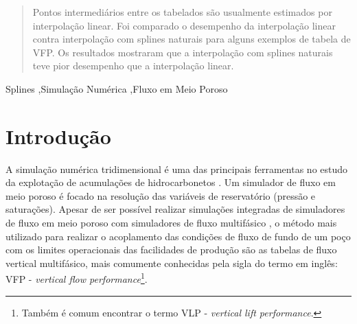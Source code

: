 \documentclass[final,5p]{elsarticle}
\numberwithin{equation}{section}
\begin{document}
\begin{frontmatter}
\begin{abstract}
    Pontos intermediários entre os tabelados são usualmente estimados por interpolação linear. Foi comparado o desempenho da interpolação linear contra interpolação com splines naturais para alguns exemplos de tabela de VFP. Os resultados mostraram que a interpolação com splines naturais teve pior desempenho que a interpolação linear. 

\end{abstract}




\begin{keyword}
    Splines \sep Simulação Numérica \sep Fluxo em Meio Poroso



\end{keyword}

\end{frontmatter}


\section{Introdução}

    A simulação numérica tridimensional é uma das principais ferramentas no estudo da explotação de acumulações de hidrocarbonetos \cite{ReservoirSimulationErtekin}. Um simulador de fluxo em meio poroso é focado na resolução das variáveis de reservatório (pressão e saturações). Apesar de ser possível realizar simulações integradas de simuladores de fluxo em meio poroso com simuladores de fluxo multifásico \cite{10.2118/195477-MS}, o método mais utilizado para realizar o acoplamento das condições de fluxo de fundo de um poço com os limites operacionais das facilidades de produção são as tabelas de fluxo vertical multifásico, mais comumente conhecidas pela sigla do termo em inglês: VFP - \emph{vertical flow performance}\footnote{Também é comum encontrar o termo VLP - \emph{vertical lift performance}.}.
\end{document}
